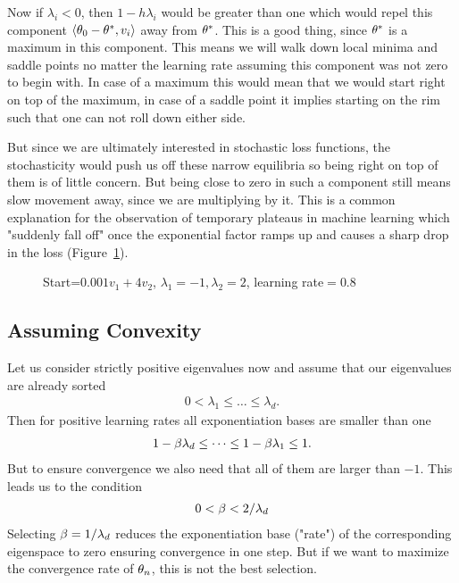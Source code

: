 Now if \(\lambda_i<0\), then \(1-h\lambda_i\) would be greater
than one which would repel this component \(\langle \theta_0 - \theta^*,
v_i\rangle\) away from \(\theta^*\). This is a good thing, since \(\theta^*\)
is a maximum in this component. This means we will walk down local minima and
saddle points no matter the learning rate assuming  this component  was not
zero to begin with. In case of a maximum this would mean that we would start
right on top of the maximum, in case of a saddle point it implies starting on
the rim such that one can not roll down either side.

But since we are ultimately interested in stochastic loss functions, the
stochasticity would push us off these narrow equilibria so being right on
top of them is of little concern. But being close to zero in such a component
still means slow movement away, since we are multiplying by it. This is a
common explanation for the observation of temporary plateaus in machine learning
which "suddenly fall off" once the exponential factor ramps up and causes a
sharp drop in the loss (Figure~\ref{fig: visualize saddlepoint gd}).
%
\begin{figure}[h]
	\centering
	\def\svgwidth{1\textwidth}
	
	\caption{Start=\(0.001v_1+4v_2\), \(\lambda_1=-1, \lambda_2=2\), learning rate\(=0.8\)}
	\label{fig: visualize saddlepoint gd}
\end{figure}

\subsection{Assuming Convexity}

Let us consider strictly positive eigenvalues now and assume that our
eigenvalues are already sorted
%
\begin{align}
	0 < \lambda_1 \le \dots \le \lambda_d.
\end{align}
%
Then for positive learning rates all exponentiation bases are smaller than one
%
\begin{align*}
	1-\beta\lambda_d \le \dots \le 1-\beta\lambda_1 \le 1.
\end{align*}
%
But to ensure convergence we also need that all of them are larger than \(-1\).
This leads us to the condition
\begin{align}\label{eq: learning rate restriction (eigenvalue)}
	0< \beta < 2/\lambda_d
\end{align}
%
Selecting \(\beta = 1/\lambda_d\) reduces the exponentiation base ("rate") of the
corresponding eigenspace to zero ensuring convergence in one step.
But if we want to maximize the convergence rate of \(\theta_n\), this is not
the best selection.

